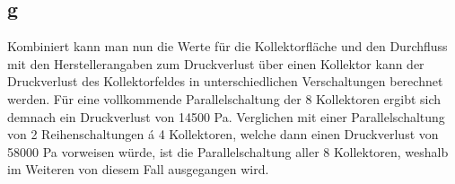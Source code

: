 \subsection{g}
Kombiniert kann man nun die Werte für die Kollektorfläche und den Durchfluss mit den
Herstellerangaben zum Druckverlust über einen Kollektor \cite[S.129]{Viessmann} kann der Druckverlust
des Kollektorfeldes in unterschiedlichen Verschaltungen berechnet werden. Für eine vollkommende
Parallelschaltung der 8 Kollektoren ergibt sich demnach ein Druckverlust von 14500 Pa.
Verglichen mit einer Parallelschaltung von 2 Reihenschaltungen á 4 Kollektoren, welche dann einen
Druckverlust von 58000 Pa vorweisen würde, ist die Parallelschaltung aller 8 Kollektoren, weshalb im Weiteren
von diesem Fall ausgegangen wird.